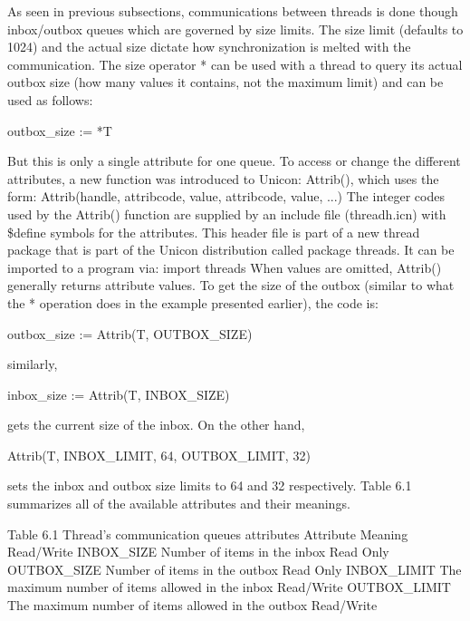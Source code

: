 As seen in previous subsections, communications between threads is done though
inbox/outbox queues which are governed by size limits. The size limit (defaults to 1024)
and the actual size dictate how synchronization is melted with the communication.
The size operator * can be used with a thread to query its actual outbox size
(how many values it contains, not the maximum limit) and can be used as follows:

outbox\_size := *T

But this is only a single attribute for one queue. To access or change the different
attributes, a new function was introduced to Unicon: Attrib(), which uses the form:
Attrib(handle, attribcode, value, attribcode, value, ...)
The integer codes used by the Attrib() function are supplied by an include file
(threadh.icn) with \$define symbols for the attributes. This header file is part of
a new thread package that is part of the Unicon distribution called package threads.
It can be imported to a program via:
import threads
When values are omitted, Attrib() generally returns attribute values.
To get the size of the outbox (similar to what the * operation does in the example
presented earlier), the code is:

outbox\_size := Attrib(T, OUTBOX\_SIZE)

similarly, 

inbox\_size := Attrib(T, INBOX\_SIZE)

gets the current size  of the inbox. On the other hand, 

Attrib(T, INBOX\_LIMIT, 64, OUTBOX\_LIMIT, 32)

sets the inbox and outbox size limits to 64 and 32 respectively. Table 6.1 summarizes
all of the available attributes and their meanings.

Table 6.1 Thread's communication queues attributes
Attribute
Meaning
Read/Write
INBOX\_SIZE
Number of items in the inbox
Read Only
OUTBOX\_SIZE
Number of items in the outbox
Read Only
INBOX\_LIMIT
The maximum number of items allowed in the inbox
Read/Write
OUTBOX\_LIMIT
The maximum number of items allowed in the outbox
Read/Write

